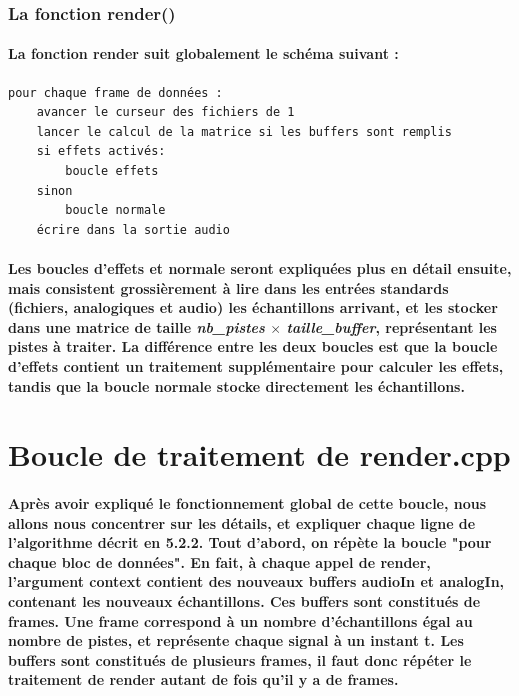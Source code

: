 \documentclass[a4paper]{article}
\begin{document}
\subsubsection{La fonction render()} \paragraph{La fonction render suit
globalement le schéma suivant :}

\begin{Verbatim}
pour chaque frame de données :
	avancer le curseur des fichiers de 1
	lancer le calcul de la matrice si les buffers sont remplis
	si effets activés:
		boucle effets
	sinon
		boucle normale
	écrire dans la sortie audio
\end{Verbatim}

\paragraph{Les boucles d’effets et normale seront expliquées plus en détail
ensuite, mais consistent grossièrement à lire dans les entrées standards
(fichiers, analogiques et audio) les échantillons arrivant, et les stocker dans
une matrice de taille \textit{nb\_pistes} $\times$ \textit{taille\_buffer},
représentant les pistes à traiter. La différence entre les deux boucles est que
la boucle d’effets contient un traitement supplémentaire pour calculer les
effets, tandis que la boucle normale stocke directement les échantillons.}

\section{Boucle de traitement de render.cpp} \paragraph{Après avoir expliqué le
fonctionnement global de cette boucle, nous allons nous concentrer sur les
détails, et expliquer chaque ligne de l’algorithme décrit en 5.2.2. Tout
d’abord, on répète la boucle "pour chaque bloc de données". En fait, à chaque
appel de render, l’argument context contient des nouveaux buffers audioIn et
analogIn, contenant les nouveaux échantillons. Ces buffers sont constitués de
frames. Une frame correspond à un nombre d’échantillons égal au nombre de
pistes, et représente chaque signal à un instant t. Les buffers sont constitués
de plusieurs frames, il faut donc répéter le traitement de render autant de fois
qu’il y a de frames.}
\end{document}
